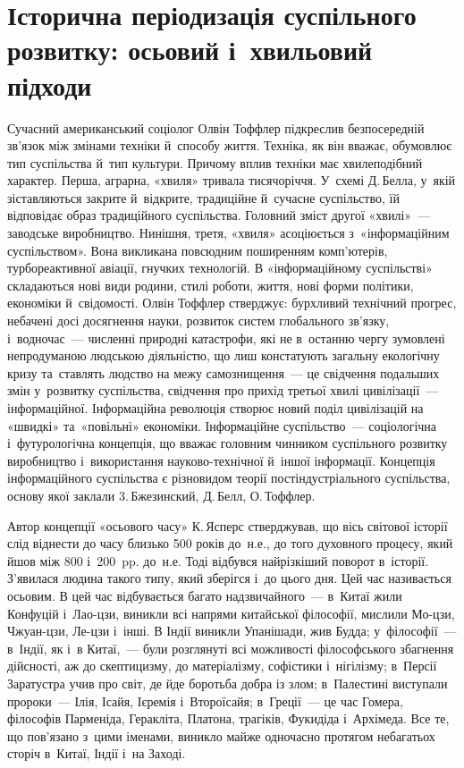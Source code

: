 \documentclass[a5paper,oneside,DIV=12,12pt,headings=small]{scrartcl}
\begin{document}
	\section{Історична періодизація суспільного розвитку: осьовий і~хвильовий підходи}
		Сучасний американський соціолог Олвін Тоффлер підкреслив безпосередній зв'язок між змінами техніки й~способу життя. Техніка, як він вважає, обумовлює тип суспільства й~тип культури. Причому вплив техніки має хвилеподібний характер. Перша, аграрна, «хвиля» тривала тисячоріччя. У~схемі Д.\,Белла, у~якій зіставляються закрите й~відкрите, традиційне й~сучасне суспільство, їй відповідає образ традиційного суспільства. Головний зміст другої «хвилі»~— заводське виробництво. Нинішня, третя, «хвиля» асоціюється з~«інформаційним суспільством». Вона викликана повсюдним поширенням комп'ютерів, турбореактивної авіації, гнучких технологій. В «інформаційному суспільстві» складаються нові види родини, стилі роботи, життя, нові форми політики, економіки й~свідомості. Олвін Тоффлер стверджує: бурхливий технічний прогрес, небачені досі досягнення науки, розвиток систем глобального зв'язку, і~водночас~— численні природні катастрофи, які не в~останню чергу зумовлені непродуманою людською діяльністю, що лиш констатують загальну екологічну кризу та~ставлять людство на межу самознищення~— це свідчення подальших змін у~розвитку суспільства, свідчення про прихід третьої хвилі цивілізації~— інформаційної. Інформаційна революція створює новий поділ цивілізацій на «швидкі» та~«повільні» економіки. Інформаційне суспільство~— соціологічна і~футурологічна концепція, що вважає головним чинником суспільного розвитку виробництво і~використання науково-технічної й~іншої інформації. Концепція інформаційного суспільства є різновидом теорії постіндустріального суспільства, основу якої заклали 3.\,Бжезинский, Д.\,Белл, О.\,Тоффлер.

		Автор концепції «осьового часу» К.\,Ясперс стверджував, що вісь світової історії слід віднести до часу близько 500 років до~н.е., до того духовного процесу, який йшов між 800 і~200~pp. до~н.е. Тоді відбувся найрізкіший поворот в~історії. З'явилася людина такого типу, який зберігся і~до цього дня. Цей час називається осьовим. В цей час відбувається багато надзвичайного~— в~Китаї жили Конфуцій і~Лао-цзи, виникли всі напрями китайської філософії, мислили Мо-цзи, Чжуан-цзи, Ле-цзи і~інші. В Індії виникли Упанішади, жив Будда; у~філософії~— в~Індії, як і~в Китаї,~— були розглянуті всі можливості філософського збагнення дійсності, аж до скептицизму, до матеріалізму, софістики і~нігілізму; в~Персії Заратустра учив про світ, де йде боротьба добра із злом; в~Палестині виступали пророки~— Ілія, Ісайя, Ієремія і~Второїсайя; в~Греції~— це час Гомера, філософів Парменіда, Геракліта, Платона, трагіків, Фукидіда і~Архімеда. Все те, що пов'язано з~цими іменами, виникло майже одночасно протягом небагатьох сторіч в~Китаї, Індії і~на Заході.
\end{document}
